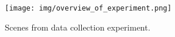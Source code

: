 \documentclass[conference]{IEEEtran}
\begin{document}

\begin{figure}[t]
 \centering
 \texttt{[image: img/overview\_of\_experiment.png]}
 \caption{Scenes from data collection experiment.}
 \label{fig:experiment}
\end{figure}
\end{document}
